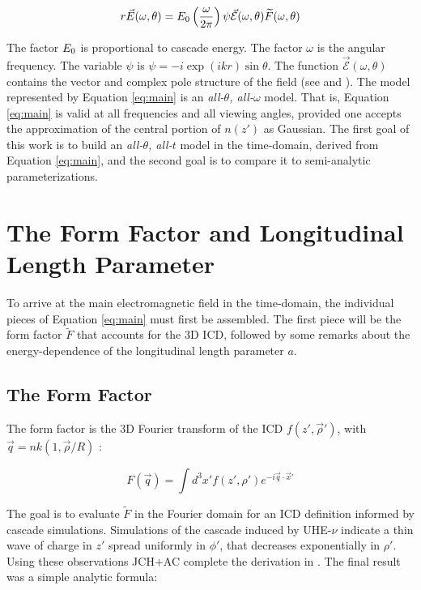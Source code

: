 \documentclass[amsmath,amssymb,aps,prd,10pt,twocolumn]{revtex4}
\begin{document}
\begin{equation}
r\vec{E}(\omega,\theta) = E_{\rm 0} \left( \frac{\omega}{2\pi} \right) \psi \vec{\mathcal{E}}(\omega,\theta) \widetilde{F}(\omega,\theta) \label{eq:main}
\end{equation}

The factor $E_{\rm 0}$ is proportional to cascade energy.  The factor $\omega$ is the angular frequency.  The variable $\psi$ is $\psi = -i \exp(ikr) \sin\theta$.  The function $\vec{\mathcal{E}}(\omega,\theta)$ contains the vector and complex pole structure of the field (see \cite{10.1103/physrevd.65.016003} and \cite{10.1016/j.astropartphys.2017.03.008}).  The model represented by Equation \ref{eq:main} is an \textit{all-$\theta$, all-$\omega$} model.  That is, Equation \ref{eq:main} is valid at all frequencies and all viewing angles, provided one accepts the approximation of the central portion of $n(z')$ as Gaussian.  The first goal of this work is to build an \textit{all-$\theta$, all-$t$} model in the time-domain, derived from Equation \ref{eq:main}, and the second goal is to compare it to semi-analytic parameterizations.

\section{The Form Factor and Longitudinal Length Parameter}
\label{sec:ff}

To arrive at the main electromagnetic field in the time-domain, the individual pieces of Equation \ref{eq:main} must first be assembled.  The first piece will be the form factor $\widetilde{F}$ that accounts for the 3D ICD, followed by some remarks about the energy-dependence of the longitudinal length parameter $a$.

\subsection{The Form Factor}
\label{sec:ff1}

The form factor is the 3D Fourier transform of the ICD $f(z',\vec{\rho}')$, with $\vec{q} = nk(1, \vec{\rho}/R)$ \cite{10.1103/physrevd.65.016003}:

\begin{equation}
F(\vec{q}) = \int d^3 x' f(z',\rho') e^{-i \vec{q} \cdot \vec{x}'}
\end{equation}

The goal is to evaluate $\widetilde{F}$ in the Fourier domain for an ICD definition informed by cascade simulations.  Simulations of the cascade induced by UHE-$\nu$ indicate a thin wave of charge in $z'$ spread uniformly in $\phi'$, that decreases exponentially in $\rho'$.  Using these observations JCH+AC complete the derivation in \cite{10.1016/j.astropartphys.2017.03.008}.  The final result was a simple analytic formula:
\end{document}
